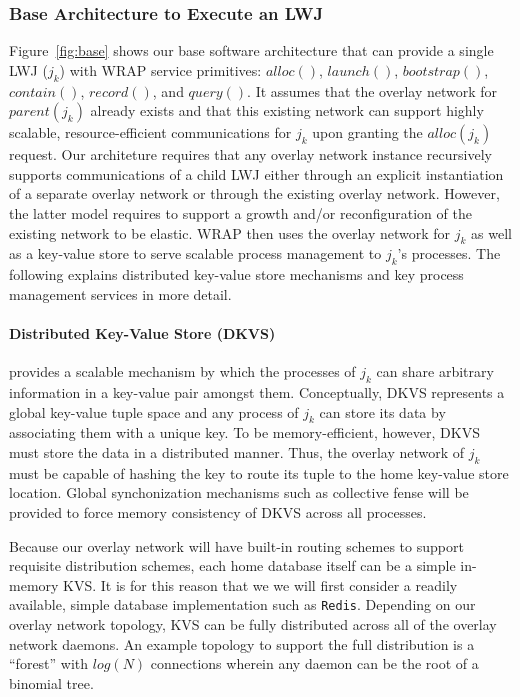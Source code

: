 \subsubsection{Base Architecture to Execute an LWJ}
Figure~\ref{fig:base} shows our base software architecture
that can provide a single LWJ ($j_k$) with WRAP service primitives:
$alloc()$,
$launch()$,
$bootstrap()$,
$contain()$,
$record()$, and
$query()$.
It assumes that the overlay network for $parent(j_k)$
already exists and that this existing network can support highly scalable,
resource-efficient communications for $j_k$ upon granting the $alloc(j_k)$ request. 
Our architeture requires that any overlay network instance recursively
supports communications of a child LWJ either
through an explicit instantiation of a separate overlay network
or through the existing overlay network. However, the latter model
requires to support a growth and/or reconfiguration
of the existing network to be elastic.
WRAP then uses the overlay network for $j_k$ as well as
a key-value store to serve scalable process management
to $j_k$'s processes.
The following explains distributed key-value store mechanisms 
and key process management services in more detail.

\paragraph{Distributed Key-Value Store (DKVS)}
\label{sect:dkvs}
provides a scalable mechanism 
by which the processes of $j_k$ can
share arbitrary information in a key-value pair amongst them.
Conceptually, DKVS represents a global key-value tuple space
and any process of $j_k$ can store its data by associating them
with a unique key. To be memory-efficient,
however, DKVS must store the data in a distributed
manner. Thus, the overlay network of $j_k$ must be capable of hashing the key
to route its tuple to the home key-value store location. Global synchonization
mechanisms such as collective fense will be provided to force
memory consistency of DKVS across all processes.

Because our overlay network will have built-in routing
schemes to support requisite distribution schemes,
each home database itself can be a simple in-memory KVS.
It is for this reason that we we will first consider a readily available, simple
database implementation such as {\tt Redis}. 
Depending on our overlay network topology,
KVS can be fully distributed across all of the overlay network daemons.
An example topology to support the full distribution is a ``forest''
with $log(N)$ connections wherein any daemon can be
the root of a binomial tree.

